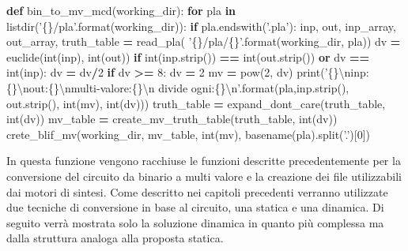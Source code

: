 \documentclass[italian,]{book}
\newenvironment{Shaded}{\begin{snugshade}}{\end{snugshade}}
\newcommand{\BuiltInTok}[1]{#1}
\newcommand{\CharTok}[1]{\textcolor[rgb]{0.31,0.60,0.02}{#1}}
\newcommand{\ControlFlowTok}[1]{\textcolor[rgb]{0.13,0.29,0.53}{\textbf{#1}}}
\newcommand{\DecValTok}[1]{\textcolor[rgb]{0.00,0.00,0.81}{#1}}
\newcommand{\KeywordTok}[1]{\textcolor[rgb]{0.13,0.29,0.53}{\textbf{#1}}}
\newcommand{\NormalTok}[1]{#1}
\newcommand{\OperatorTok}[1]{\textcolor[rgb]{0.81,0.36,0.00}{\textbf{#1}}}
\newcommand{\SpecialCharTok}[1]{\textcolor[rgb]{0.00,0.00,0.00}{#1}}
\newcommand{\StringTok}[1]{\textcolor[rgb]{0.31,0.60,0.02}{#1}}
\begin{document}
\begin{Shaded}
\begin{Highlighting}[]
\KeywordTok{def}\NormalTok{ bin_to_mv_mcd(working_dir):}
  \ControlFlowTok{for}\NormalTok{ pla }\KeywordTok{in}\NormalTok{ listdir(}\StringTok{'}\SpecialCharTok{\{\}}\StringTok{/pla'}\NormalTok{.}\BuiltInTok{format}\NormalTok{(working_dir)):}
    \ControlFlowTok{if}\NormalTok{ pla.endswith(}\StringTok{'.pla'}\NormalTok{):}
\NormalTok{      inp, out, inp_array, out_array, truth_table }\OperatorTok{=}\NormalTok{ read_pla(}
        \StringTok{'}\SpecialCharTok{\{\}}\StringTok{/pla/}\SpecialCharTok{\{\}}\StringTok{'}\NormalTok{.}\BuiltInTok{format}\NormalTok{(working_dir, pla))}
\NormalTok{      dv }\OperatorTok{=}\NormalTok{ euclide(}\BuiltInTok{int}\NormalTok{(inp), }\BuiltInTok{int}\NormalTok{(out))}
      \ControlFlowTok{if} \BuiltInTok{int}\NormalTok{(inp.strip()) }\OperatorTok{==} \BuiltInTok{int}\NormalTok{(out.strip()) }\KeywordTok{or}\NormalTok{ dv }\OperatorTok{==} \BuiltInTok{int}\NormalTok{(inp):}
\NormalTok{        dv }\OperatorTok{=}\NormalTok{ dv}\OperatorTok{/}\DecValTok{2}
      \ControlFlowTok{if}\NormalTok{ dv }\OperatorTok{>=} \DecValTok{8}\NormalTok{:}
\NormalTok{        dv }\OperatorTok{=} \DecValTok{2} 
\NormalTok{        mv }\OperatorTok{=} \BuiltInTok{pow}\NormalTok{(}\DecValTok{2}\NormalTok{, dv)}
        \BuiltInTok{print}\NormalTok{(}\StringTok{'}\SpecialCharTok{\{\}}\CharTok{\textbackslash{}n}\StringTok{inp: }\SpecialCharTok{\{\}}\CharTok{\textbackslash{}n}\StringTok{out:}\SpecialCharTok{\{\}}\CharTok{\textbackslash{}n}\StringTok{multi-valore:}\SpecialCharTok{\{\}}\CharTok{\textbackslash{}n}
\StringTok{          divide ogni:}\SpecialCharTok{\{\}}\CharTok{\textbackslash{}n}\StringTok{'}\NormalTok{.}\BuiltInTok{format}\NormalTok{(pla,inp.strip(), }
\NormalTok{          out.strip(), }\BuiltInTok{int}\NormalTok{(mv), }\BuiltInTok{int}\NormalTok{(dv)))}
\NormalTok{        truth_table }\OperatorTok{=}\NormalTok{ expand_dont_care(truth_table, }\BuiltInTok{int}\NormalTok{(dv))}
\NormalTok{        mv_table }\OperatorTok{=}\NormalTok{ create_mv_truth_table(truth_table, }\BuiltInTok{int}\NormalTok{(dv))}
\NormalTok{        crete_blif_mv(working_dir, mv_table, }\BuiltInTok{int}\NormalTok{(mv),}
\NormalTok{          basename(pla).split(}\StringTok{'.'}\NormalTok{)[}\DecValTok{0}\NormalTok{])}
\end{Highlighting}
\end{Shaded}

In questa funzione vengono racchiuse le funzioni descritte precedentemente per la conversione del circuito da binario a multi valore e la creazione dei file utilizzabili dai motori di sintesi. Come descritto nei capitoli precedenti verranno utilizzate due tecniche di conversione in base al circuito, una statica e una dinamica. Di seguito verrà mostrata solo la soluzione dinamica in quanto più complessa ma dalla struttura analoga alla proposta statica.
\end{document}
